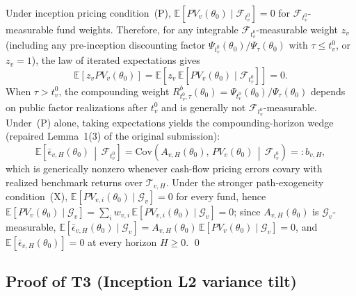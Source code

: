 Under inception pricing condition~(P), $\mathbb{E}[PV_v(\theta_0)\mid\mathcal{F}_{t_v^0}] = 0$ for $\mathcal{F}_{t_v^0}$-measurable fund weights. Therefore, for any integrable $\mathcal{F}_{t_v^0}$-measurable weight $z_v$ (including any pre-inception discounting factor $\Psi_{t_v^0}(\theta_0)/\Psi_\tau(\theta_0)$ with $\tau \le t_v^0$, or $z_v = 1$), the law of iterated expectations gives
\[
\mathbb{E}[z_v PV_v(\theta_0)] = \mathbb{E}\!\left[z_v \,\mathbb{E}[PV_v(\theta_0)\mid\mathcal{F}_{t_v^0}]\right] = 0.
\]
When $\tau > t_v^0$, the compounding weight $R^b_{t_v^0,\tau}(\theta_0) = \Psi_{t_v^0}(\theta_0)/\Psi_\tau(\theta_0)$ depends on public factor realizations after $t_v^0$ and is generally not $\mathcal{F}_{t_v^0}$-measurable. Under~(P) alone, taking expectations yields the compounding-horizon wedge (repaired Lemma~1(3) of the original submission):
\[
\mathbb{E}\!\left[\bar\epsilon_{v,H}(\theta_0)\,\middle|\,\mathcal{F}_{t_v^0}\right]
= \mathrm{Cov}\!\left(A_{v,H}(\theta_0),\, PV_v(\theta_0)\,\middle|\,\mathcal{F}_{t_v^0}\right)
=: b_{v,H},
\]
which is generically nonzero whenever cash-flow pricing errors covary with realized benchmark returns over $\mathcal{T}_{v,H}$. Under the stronger path-exogeneity condition~(X), $\mathbb{E}[PV_{v,i}(\theta_0)\mid\mathcal{G}_v] = 0$ for every fund, hence $\mathbb{E}[PV_v(\theta_0)\mid\mathcal{G}_v] = \sum_i w_{v,i}\,\mathbb{E}[PV_{v,i}(\theta_0)\mid\mathcal{G}_v] = 0$; since $A_{v,H}(\theta_0)$ is $\mathcal{G}_v$-measurable, $\mathbb{E}[\bar\epsilon_{v,H}(\theta_0)\mid\mathcal{G}_v] = A_{v,H}(\theta_0)\,\mathbb{E}[PV_v(\theta_0)\mid\mathcal{G}_v] = 0$, and $\mathbb{E}[\bar\epsilon_{v,H}(\theta_0)] = 0$ at every horizon $H \ge 0$. \qed

\subsection{Proof of T3 (Inception L2 variance tilt)}
\label{sec:proof_T3}

